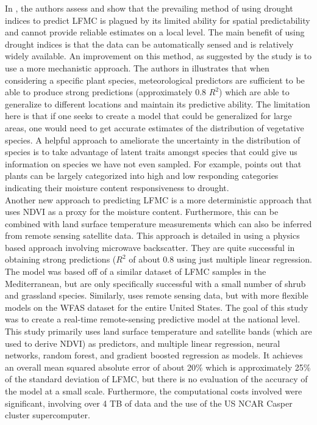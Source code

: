 \documentclass[twocolumn,10pt]{article}
\begin{document}
In \citep{ruffault2018}, the authors assess and show that the prevailing method of using drought indices to predict LFMC is plagued by its limited ability for spatial predictability and cannot provide reliable estimates on a local level. The main benefit of using drought indices is that the data can be automatically sensed and is relatively widely available. An improvement on this method, as suggested by the study is to use a more mechanistic approach.
 The authors in \citep{castro2003} illustrates that when considering a specific plant species, meteorological predictors are sufficient to be able to produce strong predictions (approximately 0.8 $R^{2}$) which are able to generalize to different locations and maintain its predictive ability. The limitation here is that if one seeks to create a model that could be generalized for large areas, one would need to get accurate estimates of the distribution of vegetative species. A helpful approach to ameliorate the uncertainty in the distribution of species is to take advantage of latent traits amongst species that could give us information on species we have not even sampled. For example, \citep{denison2009} points out that plants can be largely categorized into high and low responding categories indicating their moisture content responsiveness to drought. \\

Another new approach to predicting LFMC is a more deterministic approach that uses NDVI as a proxy for the moisture content. Furthermore, this can be combined with land surface temperature measurements which can also be inferred from remote sensing satellite data. This approach is detailed in \citep{chuvieco2004} using a physics based approach involving microwave backscatter. They are quite successful in obtaining strong predictions ($R^{2}$ of about 0.8 using just multiple linear regression. The model was based off of a similar dataset of LFMC samples in the Mediterranean, but are only specifically successful with a small number of shrub and grassland species. Similarly, \citep{mccandless2020} uses remote sensing data, but with more flexible models on the WFAS dataset for the entire United States. The goal of this study was to create a real-time remote-sensing predictive model at the national level. This study primarily uses land surface temperature and satellite bands (which are used to derive NDVI) as predictors, and multiple linear regression, neural networks, random forest, and gradient boosted regression as models. It achieves an overall mean squared absolute error of about 20\% which is approximately 25\% of the standard deviation of LFMC, but there is no evaluation of the accuracy of the model at a small scale. Furthermore, the computational costs involved were significant, involving over 4 TB of data and the use of the US NCAR Casper cluster supercomputer. \\
\end{document}

